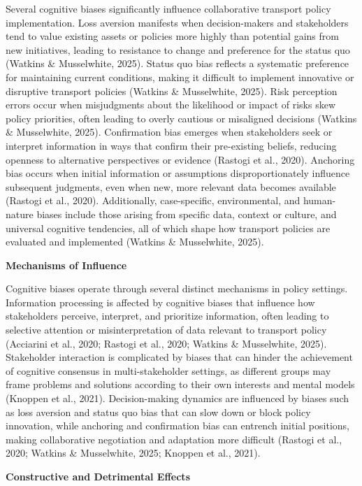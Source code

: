 Several cognitive biases significantly influence collaborative transport
policy implementation. Loss aversion manifests when decision-makers and
stakeholders tend to value existing assets or policies more highly than
potential gains from new initiatives, leading to resistance to change
and preference for the status quo (Watkins \& Musselwhite, 2025). Status
quo bias reflects a systematic preference for maintaining current
conditions, making it difficult to implement innovative or disruptive
transport policies (Watkins \& Musselwhite, 2025). Risk perception
errors occur when misjudgments about the likelihood or impact of risks
skew policy priorities, often leading to overly cautious or misaligned
decisions (Watkins \& Musselwhite, 2025). Confirmation bias emerges when
stakeholders seek or interpret information in ways that confirm their
pre-existing beliefs, reducing openness to alternative perspectives or
evidence (Rastogi et al., 2020). Anchoring bias occurs when initial
information or assumptions disproportionately influence subsequent
judgments, even when new, more relevant data becomes available (Rastogi
et al., 2020). Additionally, case-specific, environmental, and
human-nature biases include those arising from specific data, context or
culture, and universal cognitive tendencies, all of which shape how
transport policies are evaluated and implemented (Watkins \&
Musselwhite, 2025).

\textbf{Mechanisms of Influence}

Cognitive biases operate through several distinct mechanisms in policy
settings. Information processing is affected by cognitive biases that
influence how stakeholders perceive, interpret, and prioritize
information, often leading to selective attention or misinterpretation
of data relevant to transport policy (Acciarini et al., 2020; Rastogi et
al., 2020; Watkins \& Musselwhite, 2025). Stakeholder interaction is
complicated by biases that can hinder the achievement of cognitive
consensus in multi-stakeholder settings, as different groups may frame
problems and solutions according to their own interests and mental
models (Knoppen et al., 2021). Decision-making dynamics are influenced
by biases such as loss aversion and status quo bias that can slow down
or block policy innovation, while anchoring and confirmation bias can
entrench initial positions, making collaborative negotiation and
adaptation more difficult (Rastogi et al., 2020; Watkins \& Musselwhite,
2025; Knoppen et al., 2021).

\textbf{Constructive and Detrimental Effects}

